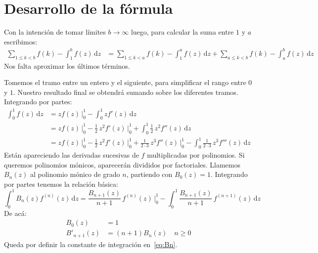 \section{Desarrollo de la fórmula}
\label{sec:desarrollo-euler-maclaurin}

  Con la intención de tomar límites \(b \rightarrow \infty\) luego,
  para calcular la suma entre \(1\) y \(a\)
  escribimos:
  \begin{align*}
    \sum_{1 \le k < b} f(k) - \int_1^b f(z) \, \mathrm{d} z
      &= \sum_{1 \le k < a} f(k) - \int_1^a f(z) \, \mathrm{d} z
	   + \sum_{a \le k < b} f(k) - \int_a^b f(z) \, \mathrm{d} z
  \end{align*}
  Nos falta aproximar los últimos términos.

  Tomemos el tramo entre un entero y el siguiente,
  para simplificar el rango entre \(0\) y \(1\).
  Nuestro resultado final
  se obtendrá sumando sobre los diferentes tramos.
  Integrando por partes:
  \begin{align*}
    \int_0^1 f(z) \, \mathrm{d} z
      &= z f(z) \, \biggr|_0^1
	  - \int_0^1 z f'(z) \, \mathrm{d} z \\
      &= z f(z) \, \biggr|_0^1
	   -  \frac{1}{2} \, z^2 f'(z) \, \biggr|_0^1
	   + \int_0^1 \frac{1}{2} \, z^2 f''(z) \, \mathrm{d} z \\
      &= z f(z) \, \biggr|_0^1
	   -  \frac{1}{2} \, z^2 f'(z) \, \biggr|_0^1
	   +  \frac{1}{2 \cdot 3} \, z^3 f''(z) \, \biggr|_0^1
	   - \int_0^1 \frac{1}{2 \cdot 3} \, z^3 f'''(z)
	       \, \mathrm{d} z
  \end{align*}
  Están apareciendo las derivadas sucesivas de \(f\)
  multiplicadas por polinomios.
  Si queremos polinomios mónicos,
  aparecerán divididos por factoriales.
  Llamemos \(B_n(z)\) al polinomio mónico de grado \(n\),
  partiendo con \(B_0(z) = 1\).
  Integrando por partes tenemos la relación básica:
  \begin{equation*}
    \int_0^1 B_n(z) f^{(n)}(z) \, \mathrm{d} z
      = \frac{B_{n + 1} (z)}{n + 1} \, f^{(n)} (z) \, \biggr|_0^1
	  - \int_0^1 \frac{B_{n + 1} (z)}{n + 1} \, f^{(n + 1)} (z)
	      \, \mathrm{d} z
  \end{equation*}
  De acá:%
  \begin{align}
    B_0(z)
      &= 1 \label{eq:B0} \\
    B'_{n + 1} (z)
      &= (n + 1) B_n(z)	 \quad n \ge 0
	    \label{eq:Bn}
  \end{align}
  Queda por definir la constante de integración en~\eqref{eq:Bn}.
